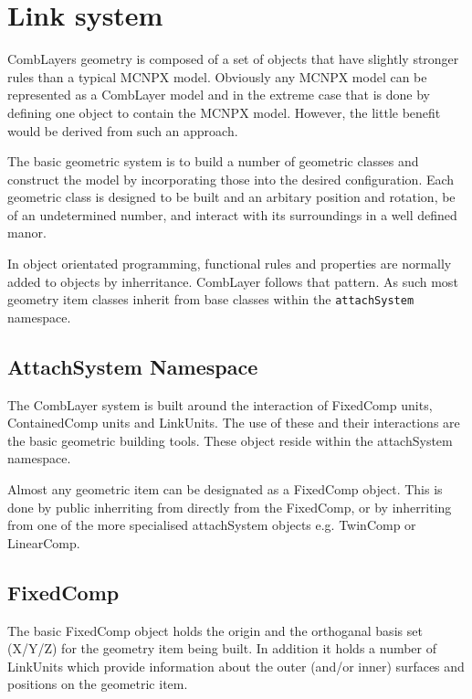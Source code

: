 \section{Link system}

CombLayers geometry is composed of a set of objects that have slightly
stronger rules than a typical MCNPX model. Obviously any MCNPX model
can be represented as a CombLayer model and in the extreme case that
is done by defining one object to contain the MCNPX model. However, the
little benefit would be derived from such an approach.

The basic geometric system is to build a number of geometric classes
and construct the model by incorporating those into the desired
configuration. Each geometric class is designed to be built and an
arbitary position and rotation, be of an undetermined number, and
interact with its surroundings in a well defined manor. 

In object orientated programming, functional rules and properties are
normally added to objects by inherritance. CombLayer follows that
pattern. As such most geometry item classes inherit from base classes within 
the {\tt attachSystem} namespace.

\subsection{AttachSystem Namespace}
\label{AttachSystem}

The CombLayer system is built around the interaction of FixedComp
units, ContainedComp units and LinkUnits. The use of these and their
interactions are the basic geometric building tools. These object
reside within the attachSystem namespace.

Almost any geometric item can be designated as a FixedComp
object. This is done by public inherriting from directly from the
FixedComp, or by inherriting from one of the more specialised attachSystem
objects e.g. TwinComp or LinearComp. 

\subsection{FixedComp}

The basic FixedComp object holds the origin and the orthoganal basis
set (X/Y/Z) for the geometry item being built. In addition it holds a 
number of LinkUnits which provide information about the outer (and/or inner)
surfaces and positions on the geometric item. 

